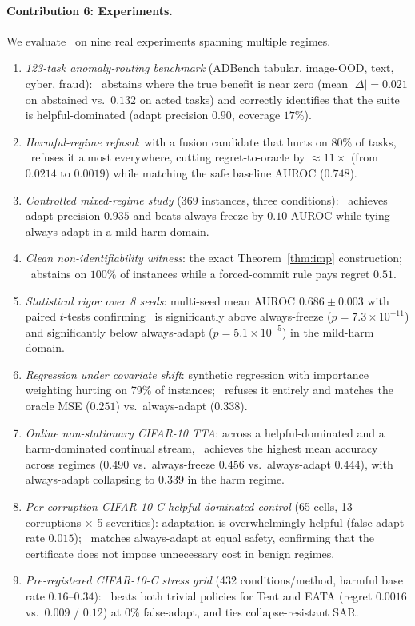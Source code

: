 \paragraph{Contribution 6: Experiments.}
We evaluate \KGA\ on nine real experiments spanning multiple regimes.
\begin{enumerate}
\item \emph{123-task anomaly-routing benchmark} (ADBench tabular,
    image-OOD, text, cyber, fraud): \KGA\ abstains where the true benefit
    is near zero (mean $|\Delta| = 0.021$ on abstained vs.\ $0.132$ on
    acted tasks) and correctly identifies that the suite is helpful-dominated
    (adapt precision $0.90$, coverage $17\%$).
\item \emph{Harmful-regime refusal}: with a fusion candidate that hurts on
    80\% of tasks, \KGA\ refuses it almost everywhere, cutting regret-to-oracle
    by $\approx 11{\times}$ (from $0.0214$ to $0.0019$) while matching the
    safe baseline AUROC ($0.748$).
\item \emph{Controlled mixed-regime study} (369 instances, three conditions):
    \KGA\ achieves adapt precision $0.935$ and beats always-freeze by
    $0.10$ AUROC while tying always-adapt in a mild-harm domain.
\item \emph{Clean non-identifiability witness}: the exact Theorem~\ref{thm:imp}
    construction; \KGA\ abstains on $100\%$ of instances while a forced-commit
    rule pays regret $0.51$.
\item \emph{Statistical rigor over 8 seeds}: multi-seed mean AUROC
    $0.686 \pm 0.003$ with paired $t$-tests confirming \KGA\ is significantly
    above always-freeze ($p = 7.3 \times 10^{-11}$) and significantly below
    always-adapt ($p = 5.1 \times 10^{-5}$) in the mild-harm domain.
\item \emph{Regression under covariate shift}: synthetic regression with
    importance weighting hurting on 79\% of instances; \KGA\ refuses it
    entirely and matches the oracle MSE ($0.251$) vs.\ always-adapt ($0.338$).
\item \emph{Online non-stationary CIFAR-10 TTA}: across a helpful-dominated
    and a harm-dominated continual stream, \KGA\ achieves the highest mean
    accuracy across regimes ($0.490$ vs.\ always-freeze $0.456$ vs.\
    always-adapt $0.444$), with always-adapt collapsing to $0.339$ in the
    harm regime.
\item \emph{Per-corruption CIFAR-10-C helpful-dominated control} (65 cells,
    13 corruptions $\times$ 5 severities): adaptation is overwhelmingly
    helpful (false-adapt rate $0.015$); \KGA\ matches always-adapt at equal
    safety, confirming that the certificate does not impose unnecessary cost
    in benign regimes.
\item \emph{Pre-registered CIFAR-10-C stress grid} (432 conditions/method,
    harmful base rate $0.16$--$0.34$): \KGA\ beats both trivial policies for
    Tent and EATA (regret $0.0016$ vs.\ $0.009$ / $0.12$) at $0\%$
    false-adapt, and ties collapse-resistant SAR.
\end{enumerate}

